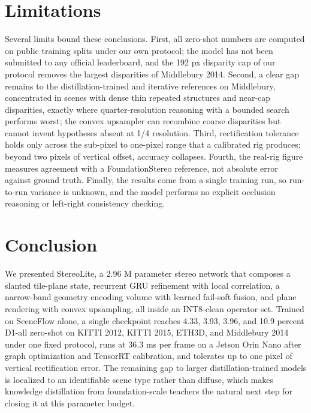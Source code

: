 \documentclass[conference]{IEEEtran}
\begin{document}
\section{Limitations}
\label{sec:limits}
Several limits bound these conclusions. First, all zero-shot numbers are computed on public training splits under our own protocol; the model has not been submitted to any official leaderboard, and the 192 px disparity cap of our protocol removes the largest disparities of Middlebury 2014. Second, a clear gap remains to the distillation-trained and iterative references on Middlebury, concentrated in scenes with dense thin repeated structures and near-cap disparities, exactly where quarter-resolution reasoning with a bounded search performs worst; the convex upsampler can recombine coarse disparities but cannot invent hypotheses absent at 1/4 resolution. Third, rectification tolerance holds only across the sub-pixel to one-pixel range that a calibrated rig produces; beyond two pixels of vertical offset, accuracy collapses. Fourth, the real-rig figure measures agreement with a FoundationStereo reference, not absolute error against ground truth. Finally, the results come from a single training run, so run-to-run variance is unknown, and the model performs no explicit occlusion reasoning or left-right consistency checking.

\section{Conclusion}
\label{sec:conclusion}
We presented StereoLite, a 2.96 M parameter stereo network that composes a slanted tile-plane state, recurrent GRU refinement with local correlation, a narrow-band geometry encoding volume with learned fail-soft fusion, and plane rendering with convex upsampling, all inside an INT8-clean operator set. Trained on SceneFlow alone, a single checkpoint reaches 4.33, 3.93, 3.96, and 10.9 percent D1-all zero-shot on KITTI 2012, KITTI 2015, ETH3D, and Middlebury 2014 under one fixed protocol, runs at 36.3 ms per frame on a Jetson Orin Nano after graph optimization and TensorRT calibration, and tolerates up to one pixel of vertical rectification error. The remaining gap to larger distillation-trained models is localized to an identifiable scene type rather than diffuse, which makes knowledge distillation from foundation-scale teachers the natural next step for closing it at this parameter budget.



\end{document}
